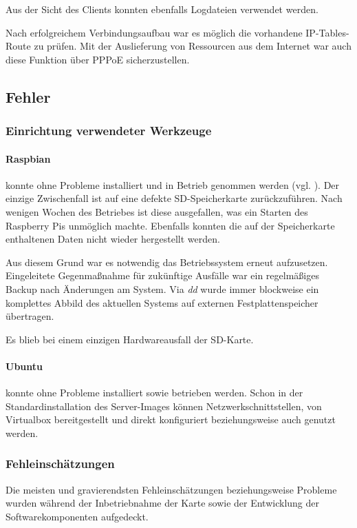 		Aus der Sicht des Clients konnten ebenfalls Logdateien verwendet werden.

		Nach erfolgreichem Verbindungsaufbau war es möglich die vorhandene
		IP-Tables-Route zu prüfen. Mit der Auslieferung von Ressourcen aus
		dem Internet war auch diese Funktion über PPPoE sicherzustellen.

	\subsection[Fehler (Schenkel)]{Fehler}
	\label{subsec:fehler}
		\subsubsection[Einrichtung verwendeter Werkzeuge (Schenkel)]{Einrichtung verwendeter Werkzeuge}
			\paragraph{Raspbian} konnte ohne Probleme installiert und in
			Betrieb genommen werden (vgl. ). Der einzige Zwischenfall ist auf eine
			defekte SD-Speicherkarte zurückzuführen. Nach wenigen Wochen
			des Betriebes ist diese ausgefallen, was ein Starten des
			Raspberry Pis unmöglich machte. Ebenfalls konnten die auf der
			Speicherkarte enthaltenen Daten nicht wieder hergestellt werden.

			Aus diesem Grund war es notwendig das Betriebssystem erneut aufzusetzen.
			Eingeleitete Gegenmaßnahme für zukünftige Ausfälle war ein regelmäßiges Backup
			nach Änderungen am System. Via \textit{dd} wurde immer blockweise ein komplettes Abbild
			des aktuellen Systems auf externen Festplattenspeicher übertragen.

			Es blieb bei einem einzigen Hardwareausfall der SD-Karte.

			\paragraph{Ubuntu} konnte ohne Probleme installiert sowie betrieben werden.
			Schon in der Standardinstallation des Server-Images können Netzwerkschnittstellen,
			von Virtualbox bereitgestellt und direkt konfiguriert beziehungsweise auch genutzt werden.

		\subsubsection[Fehleinschätzungen (Schenkel)]{Fehleinschätzungen}
		Die meisten und gravierendsten Fehleinschätzungen beziehungsweise Probleme
		wurden während der Inbetriebnahme der Karte sowie der Entwicklung
		der Softwarekomponenten aufgedeckt.


